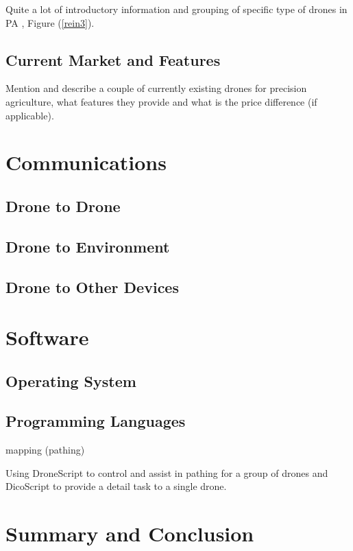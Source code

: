 \documentclass[11pt,a5paper,footinclude=true,headinclude=true, oneside]{scrbook}
\begin{document}
Quite a lot of introductory information and grouping of specific type of drones in PA \cite{Bacco_Smart_2018}, Figure (\ref{rein3}).
    
\section{Current Market and Features}

Mention and describe a couple of currently existing drones for precision agriculture, what features they provide and what is the price difference (if applicable).


\chapter{Communications}
\section{Drone to Drone}

\section{Drone to Environment}

\section{Drone to Other Devices}


\chapter{Software}
\section{Operating System}

\section{Programming Languages}

mapping (pathing)

Using DroneScript to control and assist in pathing for a group of drones and DicoScript to provide a detail task to a single drone. \cite{alwateer_enabling_2019}

\chapter{Summary and Conclusion}
\end{document}
